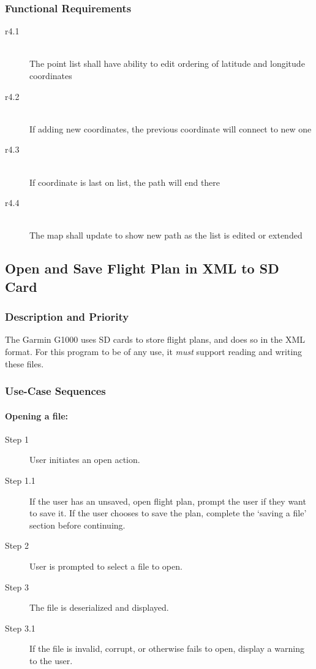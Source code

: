 \documentclass[12pt, letterpaper]{article}
\begin{document}
        \subsubsection{Functional Requirements}
        \begin{description}
            \item[r4.1] \hfill \\ The point list shall have ability to edit ordering of latitude and longitude coordinates\\
            \item[r4.2] \hfill \\ If adding new coordinates, the previous coordinate will connect to new one\\
            \item[r4.3] \hfill \\ If coordinate is last on list, the path will end there\\
      	    \item[r4.4] \hfill \\  The map shall update to show new path as the list is edited or extended\\
          \end{description}
        \subsection{Open and Save Flight Plan in XML to SD Card}
          \subsubsection{Description and Priority}
            The Garmin G1000 uses SD cards to store flight plans, and does so in the XML format.
            For this program to be of any use, it \emph{must} support reading and writing these files.
          \subsubsection{Use-Case Sequences}
            \paragraph{Opening a file:}
            \begin{description}
              \item[Step 1] User initiates an open action.
              \item[Step 1.1] If the user has an unsaved, open flight plan, prompt the user if they want to save it.
                If the user chooses to save the plan, complete the `saving a file' section before continuing.
              \item[Step 2] User is prompted to select a file to open.
              \item[Step 3] The file is deserialized and displayed.
              \item[Step 3.1] If the file is invalid, corrupt, or otherwise fails to open, display a warning to the user.
            \end{description}
\end{document}
